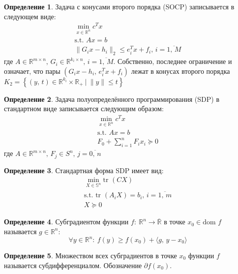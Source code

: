 \documentclass[a4paper,12pt]{article}
\renewcommand{\leq}{\ensuremath{\leqslant}}
\renewcommand{\geq}{\ensuremath{\geqslant}}
\theoremstyle{plain}
\theoremstyle{definition}
\newtheorem{definition}{Определение}[section]
\theoremstyle{remark}
\begin{document}
\begin{definition}
	Задача с конусами второго порядка (SOCP) записывается в следующем виде:
	\begin{align*}
		\min_{x \in \mathbb{R}^n} c^Tx \\
		\text{s.t. }Ax = b             \\
		\|G_ix - h_i\|_2 \leq e_i^Tx + f_i,\, i = \overline{1,\, M}
	\end{align*}
	где $A \in \mathbb{R}^{m \times n},\, G_i \in \mathbb{R}^{k_i \times n},\, i = \overline{1,\, M}$. Собственно, последнее ограничение и означает, что пары $(G_ix - h_i,\, e_i^Tx + f_i)$ лежат в конусах второго порядка $K_2 = \left\{ (y,\, t) \in \mathbb{R}^{k_i} \times \mathbb{R}_+ \:\vert\: \|y\| \leq t\right\}$
\end{definition}

\begin{definition}
	Задача полуопределённого программирования (SDP) в стандартном виде записывается следующим образом:
	\begin{align*}
		\min_{x \in \mathbb{R}^n} c^Tx \\
		\text{s.t. }Ax = b             \\
		F_0 + \sum_{i = 1}^n F_ix_i \succeq 0
	\end{align*}
	где $A \in \mathbb{R}^{m \times n},\, F_j \in S^n,\, j = \overline{0,\, n}$
\end{definition}

\begin{definition}
	Стандартная форма SDP имеет вид:
	\begin{align*}
		\min_{X \in \mathbb{S}^n} \text{tr }(CX)                    \\
		\text{s.t. } \text{tr }(A_iX) = b_i,\, i = \overline{1,\,m} \\
		X \succeq 0
	\end{align*}
\end{definition}

\begin{definition}
	Субградиентом функции $f :\: \mathbb{R}^n \to \overline{\mathbb{R}}$ в точке $x_0 \in \text{dom } f$ называется $g \in \mathbb{R}^n$:
	\[
		\forall y \in \mathbb{R}^n :\: f(y) \geq f(x_0) + \langle g,\, y - x_0\rangle
	\]
\end{definition}

\begin{definition}
	Множеством всех субградиентов в точке $x_0$ функции $f$ называется субдифференциалом. Обозначение $\partial f(x_0)$.
\end{definition}
\end{document}
